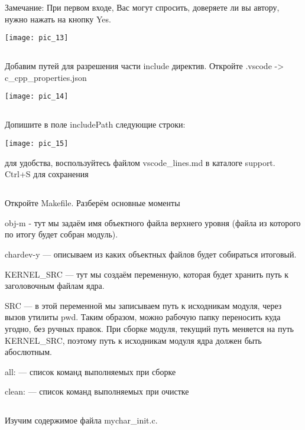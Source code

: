 \begin{Notes}{Замечание:} 
	При первом входе, Вас могут спросить, доверяете ли вы автору, нужно нажать на кнопку Yes.
	\begin{center}
		\texttt{[image: pic\_13]}
	\end{center}  
\end{Notes}

\subsection{}Добавим путей для разрешения части include директив. Откройте .vscode -> c\_cpp\_properties.json
\begin{center}
	\texttt{[image: pic\_14]}
\end{center}

\subsection{}Допишите в поле includePath следующие строки:\\
\begin{center}
	\texttt{[image: pic\_15]}
\end{center}
для удобства, воспользуйтесь файлом vscode\_lines.md в каталоге support. Ctrl+S для сохранения

\subsection{}Откройте Makefile. Разберём основные моменты

obj-m  - тут мы задаём имя объектного файла верхнего уровня (файла из которого по итогу будет собран модуль). 

chardev-y — описываем из каких объектных файлов будет собираться итоговый. 

KERNEL\_SRC — тут мы создаём переменную, которая будет хранить путь к заголовочным файлам ядра.

SRC — в этой переменной мы записываем путь к исходникам модуля, через вызов утилиты pwd. Таким образом, можно рабочую папку переносить куда угодно, без ручных правок. При сборке модуля, текущий путь меняется на путь KERNEL\_SRC, поэтому путь к исходникам модуля ядра должен быть абослютным.

all: — список команд выполняемых при сборке 

clean: — список команд выполняемых при очистке

\subsection{}Изучим содержимое файла mychar\_init.c.

